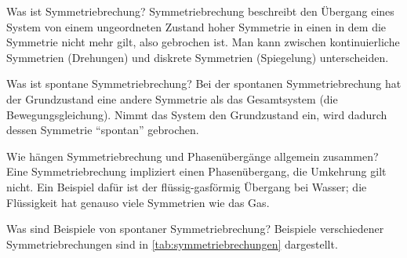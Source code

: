 \begin{fquestion}{Was ist Symmetriebrechung?}
    Symmetriebrechung beschreibt den Übergang eines System von einem ungeordneten Zustand hoher Symmetrie in einen in dem die Symmetrie nicht mehr gilt, also gebrochen ist.
    Man kann zwischen kontinuierliche Symmetrien (Drehungen) und diskrete Symmetrien (Spiegelung) unterscheiden.
\end{fquestion}


\begin{fquestion}{Was ist spontane Symmetriebrechung?}
    Bei der spontanen Symmetriebrechung hat der Grundzustand eine andere Symmetrie als das Gesamtsystem (die Bewegungsgleichung). 
    Nimmt das System den Grundzustand ein, wird dadurch dessen Symmetrie ``spontan'' gebrochen.
\end{fquestion}

\begin{fquestion}{Wie hängen Symmetriebrechung und Phasenübergänge allgemein zusammen?}
    Eine Symmetriebrechung impliziert einen Phasenübergang, die Umkehrung gilt nicht.
    Ein Beispiel dafür ist der flüssig-gasförmig Übergang bei Wasser; die Flüssigkeit hat genauso viele Symmetrien wie das Gas.
\end{fquestion}

\begin{fquestion}{Was sind Beispiele von spontaner Symmetriebrechung?}
    Beispiele verschiedener Symmetriebrechungen sind in \autoref{tab:symmetriebrechungen} dargestellt.
\end{fquestion}

